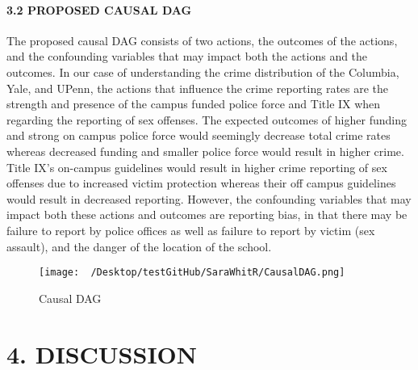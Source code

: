 \documentclass[
]{article}
\begin{document}
\hypertarget{proposed-causal-dag}{%
\paragraph{3.2 PROPOSED CAUSAL DAG}\label{proposed-causal-dag}}

The proposed causal DAG consists of two actions, the outcomes of the
actions, and the confounding variables that may impact both the actions
and the outcomes. In our case of understanding the crime distribution of
the Columbia, Yale, and UPenn, the actions that influence the crime
reporting rates are the strength and presence of the campus funded
police force and Title IX when regarding the reporting of sex offenses.
The expected outcomes of higher funding and strong on campus police
force would seemingly decrease total crime rates whereas decreased
funding and smaller police force would result in higher crime. Title
IX's on-campus guidelines would result in higher crime reporting of sex
offenses due to increased victim protection whereas their off campus
guidelines would result in decreased reporting. However, the confounding
variables that may impact both these actions and outcomes are reporting
bias, in that there may be failure to report by police offices as well
as failure to report by victim (sex assault), and the danger of the
location of the school.

\begin{figure}
\centering
\texttt{[image: ~/Desktop/testGitHub/SaraWhitR/CausalDAG.png]}
\caption{Causal DAG}
\end{figure}

\hypertarget{discussion}{%
\section{4. DISCUSSION}\label{discussion}}
\end{document}
